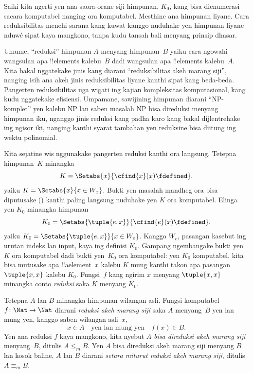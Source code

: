 \documentclass[../../../include/open-logic-section]{subfiles}
\begin{document}

\begin{explain}
Saiki kita ngerti yen ana saora-orane siji
himpunan, $K_0$, kang bisa dienumerasi
sacara komputabel nanging ora komputabel.
Mesthine ana himpunan liyane. Cara reduksibilitas
menehi sarana kang kuwat kanggo nuduhake
yen himpunan liyane nduwé sipat kaya mangkono,
tanpa kudu tansah bali menyang prinsip dhasar.

Umume, ``reduksi'' himpunan $A$ menyang
himpunan~$B$ yaiku cara ngowahi wangsulan
apa !!{element}s kalebu~$B$ dadi wangsulan
apa !!{element}s kalebu~$A$. Kita bakal
nggatekake jinis kang diarani ``reduksibilitas
akeh marang siji'', nanging isih ana
akeh jinis reduksibilitas liyane kanthi
sipat kang beda-beda. Pangerten reduksibilitas
uga wigati ing kajian kompleksitas
komputasional, kang kudu nggatekake
efisiensi. Umpamane, sawijining himpunan
diarani ``NP-komplet'' yen kalebu NP lan
saben masalah NP bisa direduksi menyang
himpunan iku, nganggo jinis reduksi
kang padha karo kang bakal dijlentrehake
ing ngisor iki, nanging kanthi syarat
tambahan yen reduksine bisa diitung
ing wektu polinomial.

Kita sejatine wis nggunakake pangerten
reduksi kanthi ora langsung. Tetepna
himpunan~$K$ minangka
\[
K = \Setabs{x}{\cfind{x}(x) \fdefined},
\]
yaiku $K = \Setabs{x}{x \in W_x}$.
Bukti yen masalah mandheg ora bisa
diputusake ()
kanthi paling langsung nuduhake yen
$K$ ora komputabel. Elinga yen $K_0$
minangka himpunan
\[
K_0 = \Setabs{\tuple{e, x}}{\cfind{e}(x) \fdefined },
\]
%
yaiku $K_0 = \Setabs{\tuple{e,x}}{x \in W_e}$. Kanggo $W_e$, pasangan kasebut ing urutan indeks lan input, kaya ing definisi $K_0$.
Gampang ngembangake bukti yen~$K$
ora komputabel dadi bukti yen~$K_0$
ora komputabel: yen $K_0$ komputabel,
kita bisa mutusake apa !!a{element}~$x$
kalebu $K$ mung kanthi takon apa
pasangan $\tuple{x, x}$ kalebu $K_0$.
Fungsi~$f$ kang ngirim $x$ menyang
$\tuple{x, x}$ minangka conto
\emph{reduksi} saka $K$ menyang $K_0$.
\end{explain}

\begin{defn}
Tetepna $A$ lan $B$ minangka himpunan
wilangan asli. Fungsi komputabel
~$f\colon \Nat \to \Nat$ diarani
\emph{reduksi akeh marang siji} saka $A$
menyang~$B$ yen lan mung yen, kanggo
saben wilangan asli~$x$,
\[
x \in A \quad \text{yen lan mung yen} \quad f(x) \in B.
\]
Yen ana reduksi $f$ kaya mangkono,
kita nyebut $A$ \emph{bisa direduksi akeh
marang siji} menyang~$B$, ditulis
$A \leq_m B$. Yen $A$ bisa direduksi
akeh marang siji menyang $B$ lan
kosok baline, $A$ lan $B$ diarani
\emph{setara miturut reduksi akeh marang siji},
ditulis $A \equiv_m B$.
\end{defn}
\end{document}
